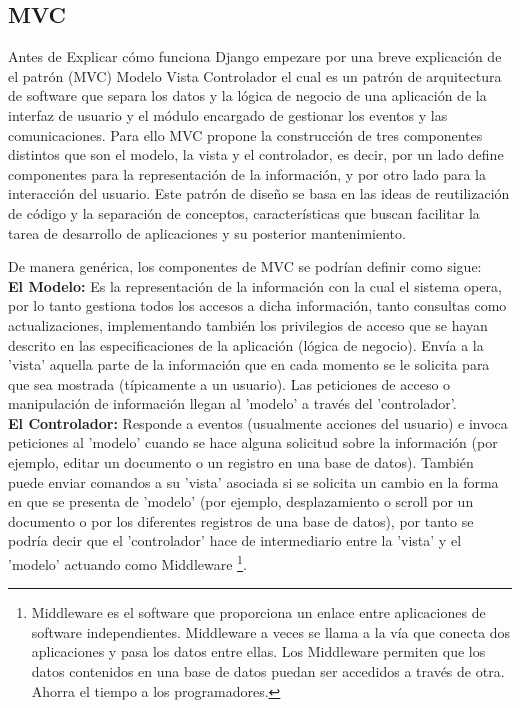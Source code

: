 \subsection{MVC}

Antes de Explicar cómo funciona Django empezare por una breve explicación de el patrón (MVC) Modelo Vista Controlador el cual es un patrón de arquitectura de software que separa los datos y la lógica de negocio de una aplicación de la interfaz de usuario y el módulo encargado de gestionar los eventos y las comunicaciones. Para ello MVC propone la construcción de tres componentes distintos que son el modelo, la vista y el controlador, es decir, por un lado define componentes para la representación de la información, y por otro lado para la interacción  del usuario. Este patrón de diseño se basa en las ideas de reutilización de  código y la separación de conceptos, características que buscan facilitar la  tarea de desarrollo de aplicaciones y su posterior mantenimiento. 

De manera genérica, los componentes de MVC se podrí­an definir como sigue: \\[0.1cm]

{\bfseries  El Modelo:} Es la representación de la información con la cual el sistema opera, por lo tanto gestiona todos los accesos a dicha información, tanto consultas como actualizaciones, implementando también los privilegios de acceso que se hayan descrito en las especificaciones de la aplicación (lógica de negocio). Enví­a a la 'vista' aquella parte de la información que en cada momento se le solicita para que sea mostrada (tí­picamente a un usuario). Las peticiones de acceso o manipulación de información llegan al 'modelo' a través del 'controlador'. \\[0.1cm]

{\bfseries El Controlador:} Responde a eventos (usualmente acciones del usuario) e invoca peticiones al 'modelo' cuando se hace alguna solicitud sobre la información (por ejemplo, editar un documento o un registro en una base de datos). También puede enviar comandos a su 'vista' asociada si se solicita un cambio en la forma en que se presenta de 'modelo' (por ejemplo, desplazamiento  o scroll por un documento o por los diferentes registros de una base de datos),   por tanto se podrí­a decir que el 'controlador' hace de intermediario entre   la 'vista' y el 'modelo' actuando como Middleware \footnote{Middleware es el software que proporciona un enlace entre aplicaciones de software independientes. Middleware a veces se llama a la ví­a que conecta dos aplicaciones y pasa los datos entre ellas. Los Middleware permiten que los datos contenidos en una base de datos puedan ser accedidos a través de otra. Ahorra el tiempo a los programadores.}. \\[0.1cm]

